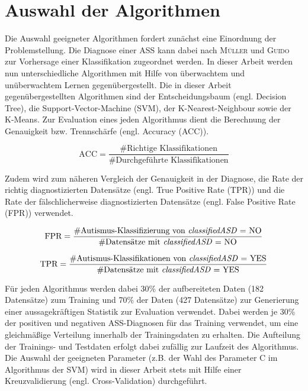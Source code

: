 \section{Auswahl der Algorithmen} \label{sec:algorithms}
Die Auswahl geeigneter Algorithmen fordert zunächst eine Einordnung der Problemstellung. Die Diagnose einer ASS kann dabei nach \textsc{Müller} und \textsc{Guido} \cite[S.~94]{Muller2016} zur Vorhersage einer Klassifikation zugeordnet werden. In dieser Arbeit werden nun unterschiedliche Algorithmen mit Hilfe von überwachtem und unüberwachtem Lernen \cite[S.~93]{Muller2016} gegenübergestellt. 
Die in dieser Arbeit gegenübergestellten Algorithmen sind der Entscheidungsbaum (engl. \glqq Decision Tree\grqq), die Support-Vector-Machine (SVM), der K-Nearest-Neighbour sowie der K-Means. %
Zur Evaluation eines jeden Algorithmus dient die Berechnung der Genauigkeit bzw. Trennschärfe (engl. \glqq Accuracy\grqq{} (ACC)).

\begin{equation} \label{math:accuracy}
\text{ACC} = \frac{\#\text{Richtige Klassifikationen}}{\#\text{Durchgeführte Klassifikationen}}
\end{equation}

Zudem wird zum näheren Vergleich der Genauigkeit in der Diagnose, die Rate der richtig diagnostizierten Datensätze (engl. \glqq True Positive Rate\grqq{} (TPR)) und die Rate der fälschlicherweise diagnostizierten Datensätze (engl. \glqq False Positive Rate\grqq{} (FPR)) verwendet.

\begin{equation} \label{math:fpr}
\text{FPR} = \frac{\#\text{Autismus-Klassifizierung von \textit{classifiedASD} = NO}}{\#\text{Datensätze mit \textit{classifiedASD} = NO}}
\end{equation}

{\setlength{\parindent}{0cm}
\begin{equation} \label{math:tpr}
\text{TPR} = \frac{\#\text{Autismus-Klassifikationen von \textit{classifiedASD} = YES}}{\#\text{Datensätze mit \textit{classifiedASD} = YES}}
\end{equation}}

Für jeden Algorithmus werden dabei 30\% der aufbereiteten Daten (182 Datensätze) zum Training und 70\%  der Daten (427 Datensätze) zur Generierung einer aussagekräftigen Statistik zur Evaluation verwendet. Dabei werden je 30\% der positiven und negativen ASS-Diagnosen für das Training verwendet, um eine gleichmäßige Verteilung innerhalb der Trainingsdaten zu erhalten. Die Aufteilung der Trainings- und Testdaten erfolgt dabei zufällig zur Laufzeit des Algorithmus. Die Auswahl der geeigneten Parameter (z.B. der Wahl des Parameter C im Algorithmus der SVM) wird in dieser Arbeit stets mit Hilfe einer Kreuzvalidierung (engl. \glqq Cross-Validation\grqq{}) durchgeführt.

